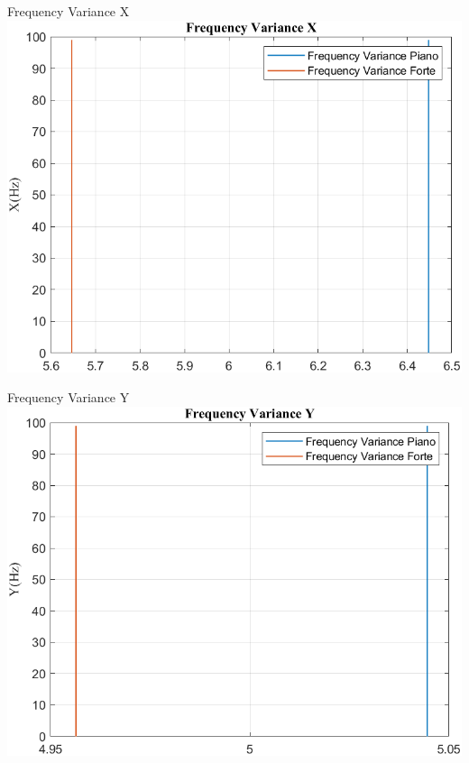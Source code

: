 	\begin{frame}{{Frequency Variance X}}
		\centering\includegraphics[height=.8\textheight]{figure/Acc/Trasformata/Frequency VarianceX}
	\end{frame}
	
	\begin{frame}{{Frequency Variance Y}}
		\centering\includegraphics[height=.8\textheight]{figure/Acc/Trasformata/Frequency VarianceY}
	\end{frame}
	
